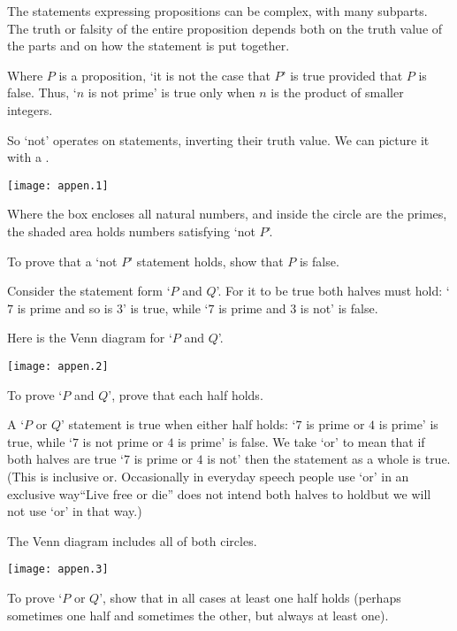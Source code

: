 The statements expressing propositions can be complex, with many subparts.
The truth or falsity of the entire proposition depends both on the
truth value of the parts and on how the statement is
put together.

Where \( P \) is a proposition,
`it is not the case that \( P \)' is true provided that \( P \) is
false.
Thus, `\( n \) is not prime' is true only when \( n \) is the
product of smaller integers.

So `not' operates on statements, inverting their truth value.
We can picture it with a 
.
\begin{center}
  \texttt{[image: appen.1]}
\end{center}
Where the box encloses all natural numbers, and inside the circle are
the primes, the shaded area holds numbers satisfying `not \( P \)'.

To prove that a `not \( P \)' statement holds, show that \( P \) is false.



Consider the statement form `\( P \) and \( Q \)'.
For it to be true both halves must hold:
`\( 7 \) is prime and so is \( 3 \)' is true, while
`\( 7 \) is prime and \( 3 \) is not' is false.

Here is the Venn diagram for `\( P \) and \( Q \)'.
\begin{center}
  \texttt{[image: appen.2]}
\end{center}
To prove `\( P \) and \( Q \)', prove that each half holds.




A `\( P \) or \( Q \)' statement is true when either half holds:
`\( 7 \) is prime or \( 4 \) is prime' is true, while `\( 7 \) is not prime
or \( 4 \) is prime' is false.
We take `or' to mean that if both halves are true
`\( 7 \) is prime or \( 4 \) is not' then the statement as a whole is true.
(This is inclusive or.
Occasionally in everyday speech people use `or' in an exclusive way\Dash ``Live
free or die'' does not intend both halves to hold\Dash but
we will not use `or' in that way.)

The Venn diagram includes all of both circles.
\begin{center}
  \texttt{[image: appen.3]}
\end{center}
To prove `\( P \) or \( Q \)', show that in all cases at least one
half holds (perhaps sometimes one half and sometimes the other,
but always at least one).


